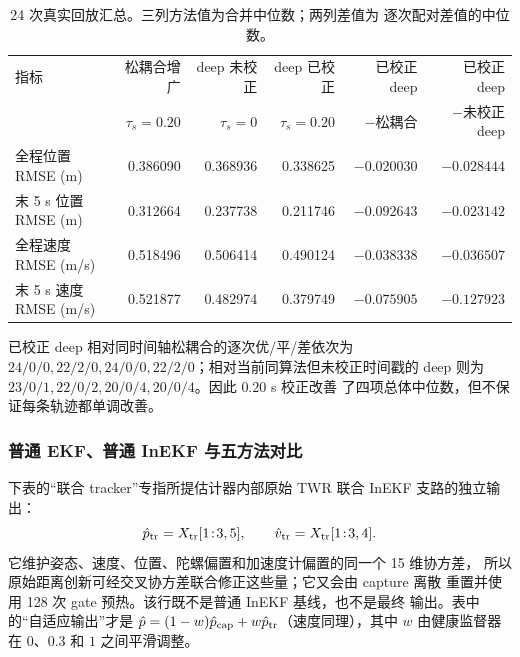 \documentclass[11pt,a4paper]{ctexart}
\begin{document}
\begin{table}[H]
\centering
\scriptsize
\setlength{\tabcolsep}{3.2pt}
\caption{24 次真实回放汇总。三列方法值为合并中位数；两列差值为
逐次配对差值的中位数。}
\begin{tabular}{lrrrrr}
\toprule
指标 & 松耦合增广 & deep 未校正 & deep 已校正 & 已校正 deep & 已校正 deep\\
 & $\tau_s=0.20$ & $\tau_s=0$ & $\tau_s=0.20$ & $-$松耦合 & $-$未校正 deep\\
\midrule
全程位置 RMSE (m) & 0.386090 & 0.368936 & 0.338625 & $-0.020030$ & $-0.028444$\\
末 5 s 位置 RMSE (m) & 0.312664 & 0.237738 & 0.211746 & $-0.092643$ & $-0.023142$\\
全程速度 RMSE (m/s) & 0.518496 & 0.506414 & 0.490124 & $-0.038338$ & $-0.036507$\\
末 5 s 速度 RMSE (m/s) & 0.521877 & 0.482974 & 0.379749 & $-0.075905$ & $-0.127923$\\
\bottomrule
\end{tabular}
\label{tab:real}
\end{table}

已校正 deep 相对同时间轴松耦合的逐次优/平/差依次为
$24/0/0,22/2/0,24/0/0,22/2/0$；相对当前同算法但未校正时间戳的
deep 则为 $23/0/1,22/0/2,20/0/4,20/0/4$。因此 $0.20$ s 校正改善
了四项总体中位数，但不保证每条轨迹都单调改善。

\subsubsection{普通 EKF、普通 InEKF 与五方法对比}

下表的``联合 tracker''专指所提估计器内部原始 TWR 联合 InEKF
支路的独立输出：
\begin{equation}
\hat p_{\rm tr}=X_{\rm tr}[1\!:\!3,5],\qquad
\hat v_{\rm tr}=X_{\rm tr}[1\!:\!3,4].
\end{equation}
它维护姿态、速度、位置、陀螺偏置和加速度计偏置的同一个 15 维协方差，
所以原始距离创新可经交叉协方差联合修正这些量；它又会由 capture 离散
重置并使用 128 次 gate 预热。该行既不是普通 InEKF 基线，也不是最终
输出。表中的``自适应输出''才是
$\hat p=(1-w)\hat p_{\rm cap}+w\hat p_{\rm tr}$（速度同理），其中
$w$ 由健康监督器在 $0$、$0.3$ 和 $1$ 之间平滑调整。
\end{document}
